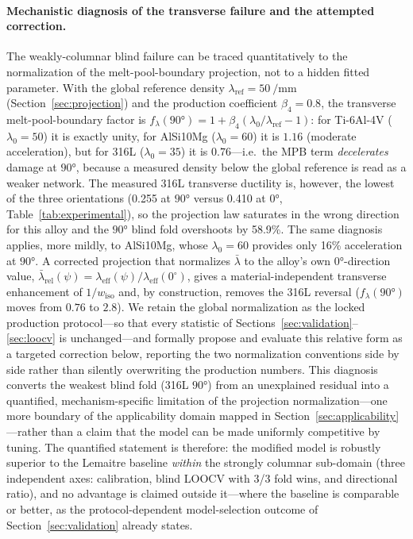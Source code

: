 \documentclass[12pt,a4paper,twocolumn]{article}
\begin{document}
\paragraph{Mechanistic diagnosis of the transverse failure and the attempted correction.}
The weakly-columnar blind failure can be traced quantitatively to the normalization of the melt-pool-boundary projection, not to a hidden fitted parameter. With the global reference density $\lambda_{\mathrm{ref}} = \SI{50}{\per\milli\meter}$ (Section~\ref{sec:projection}) and the production coefficient $\beta_4 = 0.8$, the transverse melt-pool-boundary factor is $f_\lambda(\ang{90}) = 1 + \beta_4(\lambda_0/\lambda_{\mathrm{ref}}-1)$: for Ti-6Al-4V ($\lambda_0 = 50$) it is exactly unity, for AlSi10Mg ($\lambda_0 = 60$) it is $1.16$ (moderate acceleration), but for 316L ($\lambda_0 = 35$) it is $0.76$---i.e.\ the MPB term \emph{decelerates} damage at $\ang{90}$, because a measured density below the global reference is read as a weaker network. The measured 316L transverse ductility is, however, the lowest of the three orientations (0.255 at $\ang{90}$ versus 0.410 at $\ang{0}$, Table~\ref{tab:experimental}), so the projection law saturates in the wrong direction for this alloy and the $\ang{90}$ blind fold overshoots by 58.9\%. The same diagnosis applies, more mildly, to AlSi10Mg, whose $\lambda_0 = 60$ provides only 16\% acceleration at $\ang{90}$. A corrected projection that normalizes $\bar\lambda$ to the alloy's own $\ang{0}$-direction value, $\bar\lambda_{\mathrm{rel}}(\psi) = \lambda_{\mathrm{eff}}(\psi)/\lambda_{\mathrm{eff}}(0^\circ)$, gives a material-independent transverse enhancement of $1/w_{\mathrm{iso}}$ and, by construction, removes the 316L reversal ($f_\lambda(\ang{90})$ moves from $0.76$ to $2.8$). We retain the global normalization as the locked production protocol---so that every statistic of Sections~\ref{sec:validation}--\ref{sec:loocv} is unchanged---and formally propose and evaluate this relative form as a targeted correction below, reporting the two normalization conventions side by side rather than silently overwriting the production numbers. This diagnosis converts the weakest blind fold (316L $\ang{90}$) from an unexplained residual into a quantified, mechanism-specific limitation of the projection normalization---one more boundary of the applicability domain mapped in Section~\ref{sec:applicability}---rather than a claim that the model can be made uniformly competitive by tuning. The quantified statement is therefore: the modified model is robustly superior to the Lemaitre baseline \emph{within} the strongly columnar sub-domain (three independent axes: calibration, blind LOOCV with 3/3 fold wins, and directional ratio), and no advantage is claimed outside it---where the baseline is comparable or better, as the protocol-dependent model-selection outcome of Section~\ref{sec:validation} already states.
\end{document}
